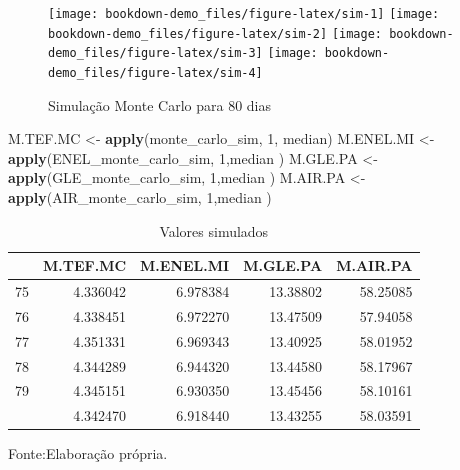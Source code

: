 \documentclass[
  12pt,
  a4paper,
  openany]{book}
\newenvironment{Shaded}{\begin{snugshade}}{\end{snugshade}}
\newcommand{\DecValTok}[1]{\textcolor[rgb]{0.00,0.00,0.81}{#1}}
\newcommand{\KeywordTok}[1]{\textcolor[rgb]{0.13,0.29,0.53}{\textbf{#1}}}
\newcommand{\NormalTok}[1]{#1}
\newcommand{\StringTok}[1]{\textcolor[rgb]{0.31,0.60,0.02}{#1}}
\begin{document}
\normalsize

\begin{figure}

{\centering \texttt{[image: bookdown-demo\_files/figure-latex/sim-1]} \texttt{[image: bookdown-demo\_files/figure-latex/sim-2]} \texttt{[image: bookdown-demo\_files/figure-latex/sim-3]} \texttt{[image: bookdown-demo\_files/figure-latex/sim-4]} 

}

\caption{Simulação Monte Carlo para 80 dias}\label{fig:sim}
\end{figure}

\scriptsize

\begin{Shaded}
\begin{Highlighting}[]
\NormalTok{M.TEF.MC \textless{}{-}}\StringTok{ }\KeywordTok{apply}\NormalTok{(monte\_carlo\_sim, }\DecValTok{1}\NormalTok{, median)}
\NormalTok{M.ENEL.MI \textless{}{-}}\StringTok{ }\KeywordTok{apply}\NormalTok{(ENEL\_monte\_carlo\_sim, }\DecValTok{1}\NormalTok{,median )}
\NormalTok{M.GLE.PA \textless{}{-}}\StringTok{ }\KeywordTok{apply}\NormalTok{(GLE\_monte\_carlo\_sim, }\DecValTok{1}\NormalTok{,median )}
\NormalTok{M.AIR.PA \textless{}{-}}\StringTok{ }\KeywordTok{apply}\NormalTok{(AIR\_monte\_carlo\_sim, }\DecValTok{1}\NormalTok{,median )}
\end{Highlighting}
\end{Shaded}

\normalsize
\begin{table}[!h]

\caption{\label{tab:unnamed-chunk-23}Valores simulados}
\centering
\begin{tabular}[t]{lrrrr}
\toprule
  & M.TEF.MC & M.ENEL.MI & M.GLE.PA & M.AIR.PA\\
\midrule
75 & 4.336042 & 6.978384 & 13.38802 & 58.25085\\
76 & 4.338451 & 6.972270 & 13.47509 & 57.94058\\
77 & 4.351331 & 6.969343 & 13.40925 & 58.01952\\
78 & 4.344289 & 6.944320 & 13.44580 & 58.17967\\
79 & 4.345151 & 6.930350 & 13.45456 & 58.10161\\
\addlinespace
80 & 4.342470 & 6.918440 & 13.43255 & 58.03591\\
\bottomrule
\end{tabular}
\end{table}
\FloatBarrier
\centering

Fonte:Elaboração própria.
\end{document}
